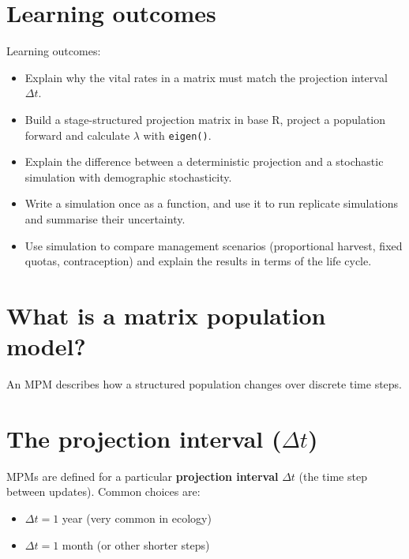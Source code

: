 \documentclass[
  a4paper]{book}
\providecommand{\tightlist}{%
  \setlength{\itemsep}{0pt}\setlength{\parskip}{0pt}}
\begin{document}
\section{Learning outcomes}\label{learning-outcomes-4}

Learning outcomes:

\begin{itemize}
\tightlist
\item
  Explain why the vital rates in a matrix must match the projection interval \(\Delta t\).
\item
  Build a stage-structured projection matrix in base R, project a population forward and calculate \(\lambda\) with \texttt{eigen()}.
\item
  Explain the difference between a deterministic projection and a stochastic simulation with demographic stochasticity.
\item
  Write a simulation once as a function, and use it to run replicate simulations and summarise their uncertainty.
\item
  Use simulation to compare management scenarios (proportional harvest, fixed quotas, contraception) and explain the results in terms of the life cycle.
\end{itemize}

\section{What is a matrix population model?}\label{what-is-a-matrix-population-model}

An MPM describes how a structured population changes over discrete time steps.

\section{\texorpdfstring{The projection interval (\(\Delta t\))}{The projection interval (\textbackslash Delta t)}}\label{the-projection-interval-delta-t}

MPMs are defined for a particular \textbf{projection interval} \(\Delta t\) (the time step between updates). Common choices are:

\begin{itemize}
\tightlist
\item
  \(\Delta t = 1\) year (very common in ecology)
\item
  \(\Delta t = 1\) month (or other shorter steps)
\end{itemize}
\end{document}
